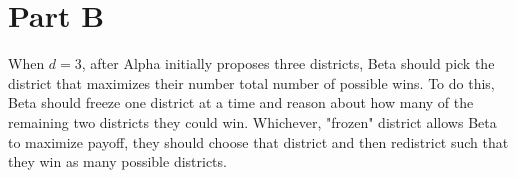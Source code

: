 \documentclass[12pt]{article}%
\begin{document}
\section*{Part B}

When $d=3$, after Alpha initially proposes three districts, Beta should pick the district that maximizes their number total number of possible wins.  To do this, Beta should freeze one district at a time and reason about how many of the remaining two districts they could win.  Whichever, "frozen" district allows Beta to maximize payoff, they should choose that district and then redistrict such that they win as many possible districts.  
\newline
\end{document}
